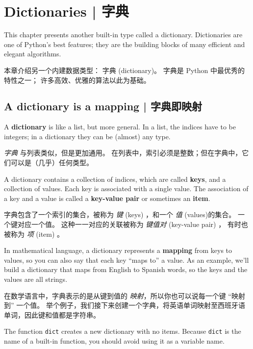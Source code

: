 

\chapter{Dictionaries  |  字典}

This chapter presents another built-in type called a dictionary.
Dictionaries are one of Python's best features; they are the
building blocks of many efficient and elegant algorithms.

本章介绍另一个内建数据类型： 字典 (dictionary)。
字典是 Python 中最优秀的特性之一； 许多高效、优雅的算法以此为基础。

\section{A dictionary is a mapping  |  字典即映射}

  
  
  

A {\bf dictionary} is like a list, but more general.  In a list,
the indices have to be integers; in a dictionary they can
be (almost) any type.

{\em 字典} 与列表类似，但是更加通用。
在列表中，索引必须是整数；但在字典中，它们可以是（几乎）任何类型。

A dictionary contains a collection of indices, which are called {\bf
  keys}, and a collection of values.  Each key is associated with a
single value.  The association of a key and a value is called a {\bf
  key-value pair} or sometimes an {\bf item}.  

字典包含了一个索引的集合，被称为 {\em 键} (keys) ，和一个 {\em 值} (values)的集合。 一个键对应一个值。 这种一一对应的关联被称为 {\em 键值对} (key-value pair) ， 有时也被称为 {\em 项} (item) 。

In mathematical language, a dictionary represents a {\bf mapping}
from keys to values, so you can also say that each key
``maps to'' a value.
As an example, we'll build a dictionary that maps from English
to Spanish words, so the keys and the values are all strings.

在数学语言中，字典表示的是从键到值的 {\em 映射}，所以你也可以说每一个键 ``映射到'' 一个值。  举个例子，我们接下来创建一个字典，将英语单词映射至西班牙语单词，因此键和值都是字符串。

The function {\tt dict} creates a new dictionary with no items.
Because {\tt dict} is the name of a built-in function, you
should avoid using it as a variable name.

